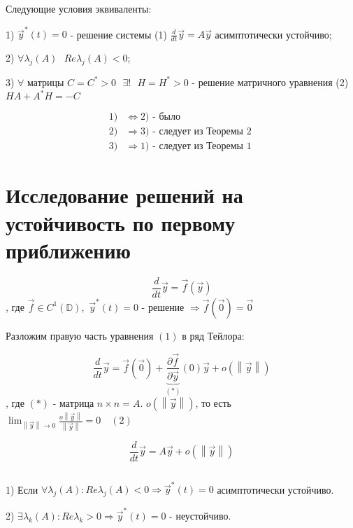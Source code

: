 \documentclass[12pt, a4paper]{report}
\begin{document}
\begin{theorem}
    Следующие условия эквиваленты: 
    
    1) \( \vec{ y } ^* (t ) = 0  \) - решение системы (1) \( \displaystyle  \frac{d}{dt }  \vec{ y}  = A \vec{ y}   \) асимптотически устойчиво; 

    2) \( \forall  \lambda_j (A ) \text{ }  Re \lambda_j (A )< 0  \); 

    3) \( \forall   \) матрицы \( C = C^* >0 \text{ }  \exists  ! \text{ }  H = H^* > 0  \) - решение матричного уравнения (2) \( HA + A^* H = - C  \) 

    \[ \begin{aligned}
    1) & \Leftrightarrow 2) \text{ - было } \\
    2) &\Rightarrow  3) \text{ - следует из Теоремы 2 } \\
    3) &\Rightarrow 1) \text{ - следует из Теоремы 1} 
    \end{aligned} \] 
\end{theorem}

\section{Исследование решений на устойчивость по первому приближению}

\[ \frac{d}{dt }  \vec{ y}  = \vec{ f }  (\vec{ y} ) \tag{1} \] 
, где \( \vec{ f }  \in  C ^1 (\mathbb{D} ) ,\) \( \vec{  y} ^{* }  (t ) = 0  \) - решение \( \Rightarrow   \vec{ f }  (\vec{ 0 } ) = \vec{0 } \) 

Разложим правую часть уравнения \( (1) \) в ряд Тейлора: 

\[ \frac{d}{dt }  \vec{ y}  = \vec{ f }  (\vec{ 0}  ) + \underbrace{\frac{ \partial  \vec{ f } }{\partial  \vec{ y}  } }_{(*)}(0 ) \vec{ y } + o(\left\lVert \vec{ y}  \right\rVert)   \] 
, где \( (*) \) - матрица \( n \times  n  = A  \). \( o(\left\lVert  \vec{ y}  \right\rVert)  \), то есть \( \displaystyle \lim_{\left\lVert  \vec{y }  \right\rVert \to 0 } \frac{o \left\lVert \vec{y }  \right\rVert}{\left\lVert  \vec{ y }  \right\rVert } = 0   \quad  (2)\) 

\[ \frac{d}{dt } \vec{ y}  = A \vec{ y}  + o (\left\lVert  \vec{ y }  \right\rVert) \] 

\begin{theorem} \(  \) 

    1) Если \( \forall  \lambda_j (A ): Re \lambda_j (A ) < 0 \Rightarrow \vec{ y} ^* (t ) = 0  \)  асимптотически устойчиво. 

    2) \( \exists  \lambda_k (A ) : Re \lambda_k >0 \Rightarrow \vec{ y } ^* (t ) = 0  \) - неустойчиво.
\end{theorem}


\ifdefined\mainfile
\else
    
\end{document}
